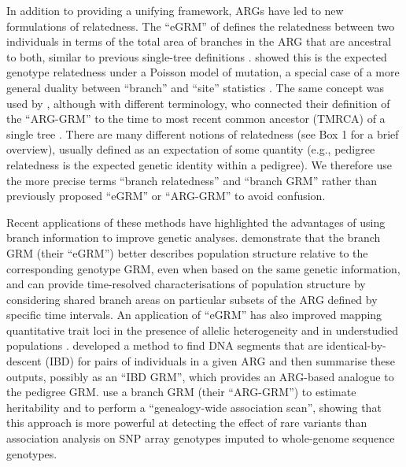 In addition to providing a unifying framework,
ARGs have led to new formulations of relatedness.
%
The ``eGRM'' of \citet{fan2022genealogical}
defines the relatedness between two individuals
in terms of the total area of branches in the ARG that are ancestral to both,
similar to previous single-tree definitions \citep{slatkin1991inbreeding}.
%
\citet{fan2022genealogical} showed this is the expected genotype relatedness
under a Poisson model of mutation,
a special case of a more general duality between ``branch''
and ``site'' statistics \citep{ralph2019empirical, ralph2020efficiently}.
%
The same concept was used by \citet{zhang2023biobank},
although with different terminology,
who connected their definition of the ``ARG-GRM'' to
the time to most recent common ancestor (TMRCA)
of a single tree \citep{slatkin1991inbreeding, mcvean2009genealogical}.
%
There are many different notions of relatedness (see Box 1 for a 
brief overview), usually defined as an expectation of some 
quantity (e.g., pedigree relatedness is the expected genetic identity within a pedigree).
We therefore use the more precise terms 
``branch relatedness'' and ``branch GRM'' 
rather than previously proposed ``eGRM'' or ``ARG-GRM'' 
to avoid confusion.

Recent applications of these methods have highlighted the advantages of
using branch information to improve genetic analyses.
%
\citet{fan2022genealogical} demonstrate that the branch GRM (their ``eGRM'')
better describes population structure relative to the corresponding genotype GRM,
even when based on the same genetic information,
and can provide time-resolved characterisations of population structure
by considering shared branch areas on particular subsets of the ARG
defined by specific time intervals.
%
An application of ``eGRM'' has also improved mapping quantitative trait loci
in the presence of allelic heterogeneity and in understudied populations \citep{link2023tree}.
%
\citet{tsambos2022efficient} developed a method
to find DNA segments that are identical-by-descent (IBD) for pairs of individuals in a given ARG and
then summarise these outputs, possibly as an ``IBD GRM'',
which provides an ARG-based analogue to the pedigree GRM.
%
\citet{zhang2023biobank} use a branch GRM (their ``ARG-GRM'')
to estimate heritability and to perform a ``genealogy-wide association scan'',
showing that this approach is more powerful at detecting the effect of rare variants
than association analysis on SNP array genotypes imputed to whole-genome sequence genotypes.

